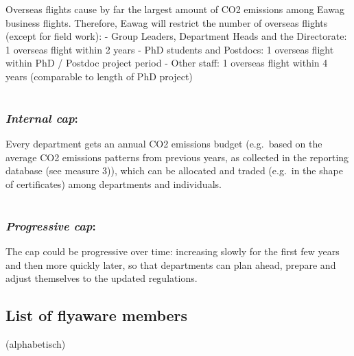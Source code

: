 \documentclass[]{tufte-handout}
\begin{document}
Overseas flights cause by far the largest amount of CO2 emissions among
Eawag business flights. Therefore, Eawag will restrict the number of
overseas flights (except for field work): - Group Leaders, Department
Heads and the Directorate: 1 overseas flight within 2 years - PhD
students and Postdocs: 1 overseas flight within PhD / Postdoc project
period - Other staff: 1 overseas flight within 4 years (comparable to
length of PhD project)

\hypertarget{internal_cap}{%
\section{}\label{internal_cap}}

\hypertarget{internal-cap}{%
\subsubsection{\texorpdfstring{\emph{Internal
cap}:}{Internal cap:}}\label{internal-cap}}

Every department gets an annual CO2 emissions budget (e.g.~based on the
average CO2 emissions patterns from previous years, as collected in the
reporting database (see measure 3)), which can be allocated and traded
(e.g.~in the shape of certificates) among departments and individuals.

\hypertarget{progressive_cap}{%
\section{}\label{progressive_cap}}

\hypertarget{progressive-cap}{%
\subsubsection{\texorpdfstring{\emph{Progressive
cap}:}{Progressive cap:}}\label{progressive-cap}}

The cap could be progressive over time: increasing slowly for the first
few years and then more quickly later, so that departments can plan
ahead, prepare and adjust themselves to the updated regulations.

\hypertarget{list-of-flyaware-members}{%
\subsection{List of flyaware members}\label{list-of-flyaware-members}}

(alphabetisch)


\end{document}
